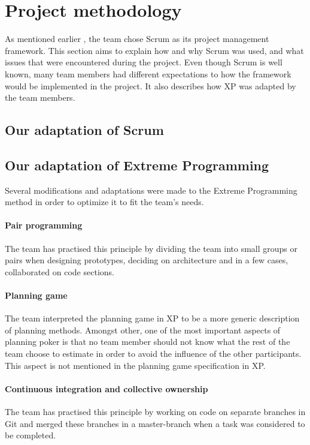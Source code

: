 \section{Project methodology}
As mentioned earlier , the team chose Scrum as its project management framework. This section aims to explain how and why Scrum was used, and what issues that were encountered during the project. Even though Scrum is well known, many team members had different expectations to how the framework would be implemented in the project. It also describes how XP was adapted by the team members.

\subsection{Our adaptation of Scrum}


\subsection{Our adaptation of Extreme Programming}
Several modifications and adaptations were made to the Extreme Programming method in order to optimize it to fit the team's needs.

\paragraph{Pair programming}
The team has practised this principle by dividing the team into small groups or pairs when designing prototypes, deciding on architecture and in a few cases, collaborated on code sections.

\paragraph{Planning game}
The team interpreted the planning game in XP to be a more generic description of planning methods.  Amongst other, one of the most important aspects of planning poker is that no team member should not know what the rest of the team choose to estimate in order to avoid the influence of the other participants. This aspect is not mentioned in the planning game specification in XP.

\paragraph{Continuous integration and collective ownership}
The team has practised this principle by working on code on separate branches in Git and merged these branches in a master-branch when a task was considered to be completed.

